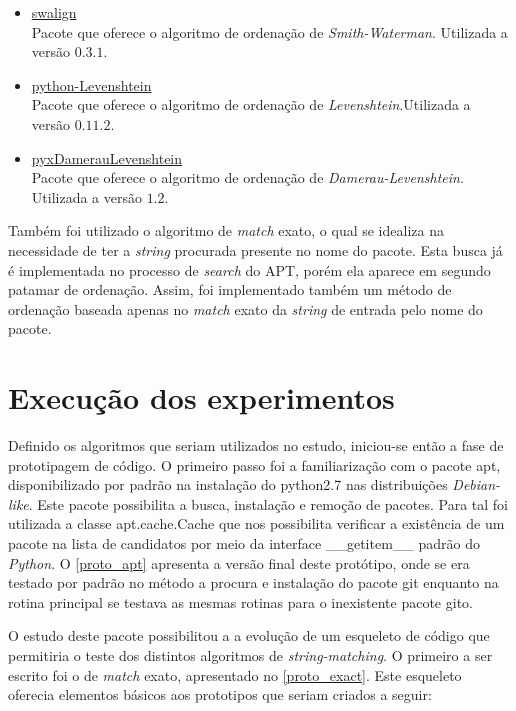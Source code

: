 \begin{itemize}
	\item \href{https://pypi.python.org/pypi/swalign/}{swalign}\\
	Pacote que oferece o algoritmo de ordenação de \textit{Smith-Waterman}. Utilizada a versão $0.3.1$.
	\item \href{https://pypi.python.org/pypi/python-Levenshtein/}{python-Levenshtein}\\
	Pacote que oferece o algoritmo de ordenação de \textit{Levenshtein}.Utilizada a versão $0.11.2$.
	\item \href{https://pypi.python.org/pypi/pyxDamerauLevenshtein/}{pyxDamerauLevenshtein}\\
	Pacote que oferece o algoritmo de ordenação de \textit{Damerau-Levenshtein}. Utilizada a versão $1.2$.
\end{itemize}

Também foi utilizado o algoritmo de \textit{match} exato, o qual se idealiza na necessidade de ter a \textit{string} procurada presente no nome do pacote. Esta busca já é implementada no processo de \textit{search} do APT, porém ela aparece em segundo patamar de ordenação. Assim, foi implementado também um método de ordenação baseada apenas no \textit{match} exato  da \textit{string} de entrada pelo nome do pacote.


\section{Execução dos experimentos}

Definido os algoritmos que seriam utilizados no estudo, iniciou-se então a fase de prototipagem de código. O primeiro passo foi a familiarização com o pacote {\code apt}, disponibilizado por padrão na instalação do {\code python2.7} nas distribuições \textit{Debian-like}. Este pacote possibilita a busca, instalação e remoção de pacotes. Para tal foi utilizada a classe {\code apt.cache.Cache} que nos possibilita verificar a existência de um pacote na lista de candidatos por meio da interface {\code \_\_getitem\_\_} padrão do \textit{Python}. O \autoref{proto_apt} apresenta a versão final deste protótipo, onde se era testado por padrão no método a procura e instalação do pacote {\code git} enquanto na rotina principal se testava as mesmas rotinas para o inexistente pacote {\code gito}.



O estudo deste pacote possibilitou a a evolução de um esqueleto de código que permitiria o teste dos distintos algoritmos de \textit{string-matching}. O primeiro a ser escrito foi o de \textit{match} exato, apresentado no \autoref{proto_exact}. Este esqueleto oferecia elementos básicos aos prototipos que seriam criados a seguir:

